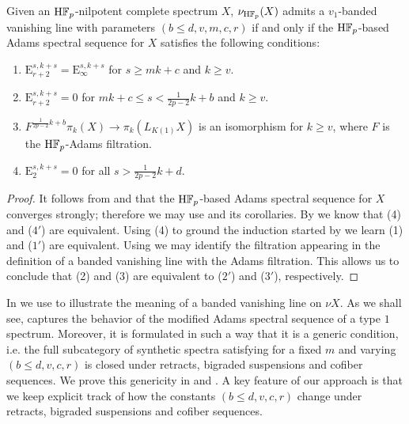 \begin{prop} \label{prop:banded-adams}
    Given an $\mathrm{H}\mathbb{F}_p$-nilpotent complete spectrum $X$, $\nu_{\mathrm{H}\mathbb{F}_p} (X)$ admits a $v_1$-banded vanishing line with parameters $(b \leq d, v, m, c, r)$ if and only if the $\mathrm{H}\mathbb{F}_p$-based Adams spectral sequence for $X$ satisfies the following conditions:
    \begin{enumerate}
        \item[($1'$)] $\mathrm{E}_{r+2} ^{s,k+s} = \mathrm{E}_{\infty} ^{s,k+s}$ for $s \geq mk+c$ and $k \geq v$.
        \item[($2'$)] $\mathrm{E}_{r+2} ^{s,k+s} = 0$ for $mk+c \leq s < \frac{1}{2p-2}k + b$ and $k \geq v$.
        \item[($3'$)]$F^{\frac{1}{2p-2} k + b} \pi_k (X) \to \pi_k (L_{K(1)} X)$ is an isomorphism for $k \geq v$, where $F$ is the $\mathrm{H}\mathbb{F}_p$-Adams filtration.
        \item[($4'$)] $\mathrm{E}_2 ^{s,k+s} = 0$ for all $s > \frac{1}{2p-2}k+d$.
    \end{enumerate}
\end{prop}

\begin{proof}
    It follows from  and  that the $\mathrm{H}\mathbb{F}_p$-based Adams spectral sequence for $X$ converges strongly; therefore we may use  and its corollaries. By  we know that (4) and ($4'$) are equivalent. Using (4) to ground the induction started by  we learn (1) and ($1'$) are equivalent. Using  we may identify the filtration appearing in the definition of a banded vanishing line with the Adams filtration. This allows us to conclude that (2) and (3) are equivalent to ($2'$) and ($3'$), respectively.
\end{proof}

In  we use  to illustrate the meaning of a banded vanishing line on $\nu X$. 
As we shall see,  captures the behavior of the modified Adams spectral sequence of a type $1$ spectrum. Moreover, it is formulated in such a way that it is a generic condition, i.e. the full subcategory of synthetic spectra satisfying  for a fixed $m$ and varying $(b \leq d, v, c, r)$ is closed under retracts, bigraded suspensions and cofiber sequences. We prove this genericity in  and . A key feature of our approach is that we keep explicit track of how the constants $(b \leq d, v, c, r)$ change under retracts, bigraded suspensions and cofiber sequences.

